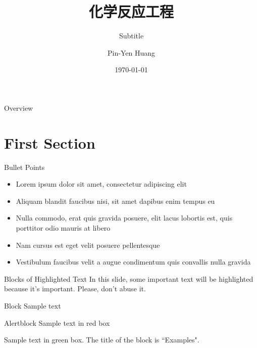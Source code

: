 \documentclass[aspectratio=169,xcolor=dvipsnames]{beamer}
\title[short title]{化学反应工程} %
\subtitle{Subtitle}
\author[Pin-Yen] {Pin-Yen Huang}
\institute[NTU] %
{
    Department of Computer Science and Information Engineering \\
    National Taiwan University %
}
\date{\today} %
\begin{document}
\begin{frame}
    \titlepage
\end{frame}

\begin{frame}{Overview}
    \tableofcontents
\end{frame}

\section{First Section}

\begin{frame}{Bullet Points}
    \begin{itemize}
        \item Lorem ipsum dolor sit amet, consectetur adipiscing elit
        \item Aliquam blandit faucibus nisi, sit amet dapibus enim tempus eu
        \item Nulla commodo, erat quis gravida posuere, elit lacus lobortis est, quis porttitor odio mauris at libero
        \item Nam cursus est eget velit posuere pellentesque
        \item Vestibulum faucibus velit a augue condimentum quis convallis nulla gravida
    \end{itemize}
\end{frame}


\begin{frame}{Blocks of Highlighted Text}
    In this slide, some important text will be \alert{highlighted} because it's important. Please, don't abuse it.

    \begin{block}{Block}
        Sample text
    \end{block}

    \begin{alertblock}{Alertblock}
        Sample text in red box
    \end{alertblock}

    \begin{examples}
        Sample text in green box. The title of the block is ``Examples".
    \end{examples}
\end{frame}
\end{document}
